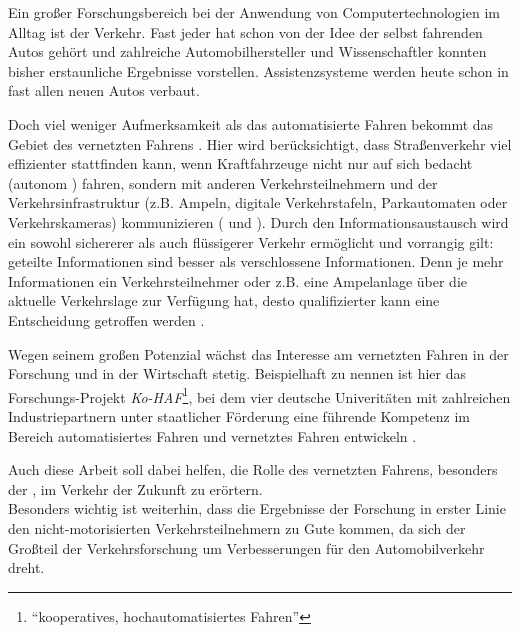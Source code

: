 Ein großer Forschungsbereich bei der Anwendung von Computertechnologien im Alltag ist der Verkehr. Fast jeder hat schon von der Idee der selbst fahrenden Autos gehört und zahlreiche Automobilhersteller und Wissenschaftler konnten bisher erstaunliche Ergebnisse vorstellen. Assistenzsysteme werden heute schon in fast allen neuen Autos verbaut.\kleinerabstand

\noindent Doch viel weniger Aufmerksamkeit als das automatisierte Fahren \cite{unterschied_fahren} bekommt das Gebiet des vernetzten Fahrens \cite{unterschied_fahren}. Hier wird berücksichtigt, dass Straßenverkehr viel effizienter stattfinden kann, wenn Kraftfahrzeuge nicht nur auf sich bedacht (autonom \cite{unterschied_fahren}) fahren, sondern mit anderen Verkehrsteilnehmern und der Verkehrsinfrastruktur (z.B. Ampeln, digitale Verkehrstafeln, Parkautomaten oder Verkehrskameras) kommunizieren ( und  \cite{c2c_c2i_heise, c2c_c2x_koblenz}). Durch den Informationsaustausch wird ein sowohl sichererer als auch flüssigerer Verkehr ermöglicht und vorrangig gilt: geteilte Informationen sind besser als verschlossene Informationen. Denn je mehr Informationen ein Verkehrsteilnehmer oder z.B. eine Ampelanlage über die aktuelle Verkehrslage zur Verfügung hat, desto qualifizierter kann eine Entscheidung getroffen werden \cite{c2c_c2i_heise, c2c_c2x_koblenz}.\kleinerabstand

\noindent Wegen seinem großen Potenzial wächst das Interesse am vernetzten Fahren in der Forschung und in der Wirtschaft stetig. Beispielhaft zu nennen ist hier das Forschungs-Projekt \emph{Ko-HAF}\footnote{``kooperatives, hochautomatisiertes Fahren''}, bei dem vier deutsche Univeritäten mit zahlreichen Industriepartnern unter staatlicher Förderung eine führende Kompetenz im Bereich automatisiertes Fahren und vernetztes Fahren entwickeln \cite{kohaf_projektpartner, kohaf_ergebnisse}.\kleinerabstand

Auch diese Arbeit soll dabei helfen, die Rolle des vernetzten Fahrens, besonders der , im Verkehr der Zukunft zu erörtern.\\
Besonders wichtig ist weiterhin, dass die Ergebnisse der Forschung in erster Linie den nicht-motorisierten Verkehrsteilnehmern zu Gute kommen, da sich der Großteil der Verkehrsforschung um Verbesserungen für den Automobilverkehr dreht.
